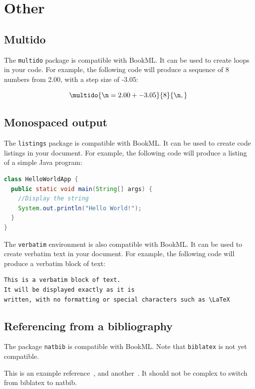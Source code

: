 \section{Other}
\subsection{Multido}
\label{demo:multido}
The \verb|multido| package is compatible with BookML. It can be used to create loops in your code. For example, the following code will produce a sequence of 8 numbers from 2.00, with a step size of -3.05:

$$
\multido{\n=2.00+-3.05}{8}{\n, }
$$

\subsection{Monospaced output}
\label{demo:code}
The \verb|listings| package is compatible with BookML. It can be used to create code listings in your document. For example, the following code will produce a listing of a simple Java program:


\begin{lstlisting}[language=Java]
class HelloWorldApp {
  public static void main(String[] args) {
    //Display the string
    System.out.println("Hello World!");
  }
}
\end{lstlisting}
The \verb|verbatim| environment is also compatible with BookML. It can be used to create verbatim text in your document. For example, the following code will produce a verbatim block of text:
\begin{verbatim}
This is a verbatim block of text.
It will be displayed exactly as it is 
written, with no formatting or special characters such as \LaTeX
\end{verbatim}

\subsection{Referencing from a bibliography}
\label{bib}

The package \verb|natbib| is compatible with BookML. Note that \verb|biblatex| is not yet compatible.

This is an example reference~\cite{strikwerda2004}, and another~\citep{parret2016time}. It should not be complex to switch from biblatex to natbib. 


